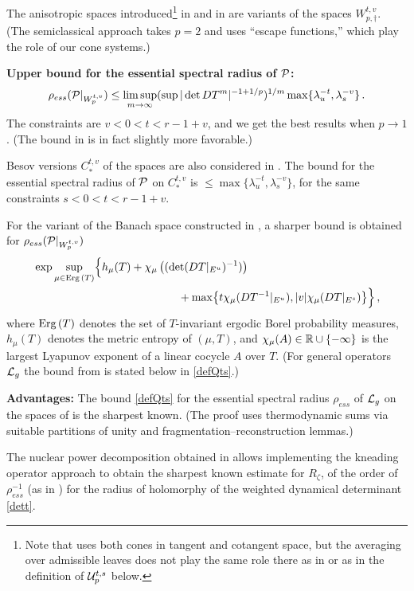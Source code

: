 \documentclass[10pt,twoside]{amsart}
\begin{document}
The anisotropic spaces introduced\footnote{\label{beware}Note that \cite{BT2} uses both cones in tangent and cotangent space, but the averaging
over admissible leaves does not play the same role there as in \cite{GL1, DL} or
as in the definition of $\mathcal{U}^{t,s}_p$ below.} in   \cite{BT2} and in  \cite{FRS} are variants
of the spaces $W^{t,v}_{p,\dagger}$. 
(The semiclassical approach \cite{FRS} takes $p=2$ and uses ``escape functions,'' which play
the role of our cone systems.) 

\medskip

{\bf Upper bound for the essential spectral radius of $\mathcal {P}$:}
$$\rho_{ess}(\mathcal {P}|_{W^{t,v}_p})\le \limsup_{m \to \infty} (\sup |\det DT^{m}|^{-1+1/p} )^{1/m}
\max \{ \lambda_u^{-t}, \lambda_s^{-v}\} \, .$$ 
The constraints are $v<0<t<r-1+v$, and we get the best results when $p\to 1$.
(The bound in \cite{BT1}
is in fact slightly more favorable.)


Besov versions  $C_*^{t,v}$ of the spaces are also considered in \cite{BT1}. The bound
for
the essential spectral radius of $\mathcal {P}$ on  $C_*^{t,v}$
is  $\le \max \{ \lambda_u^{-t}, \lambda_s^{-v}\}$,
for the same constraints  $s<0<t<r-1+v$.


For the variant of the Banach space  constructed in \cite{BT2}, a
sharper bound is obtained for $\rho_{ess}(\mathcal {P}|_{W^{t,v}_p})$
\begin{align*}
\nonumber &\exp \sup_{\mu \in \mathrm{Erg}\,(T)}
\Bigl \{h_\mu(T) + \chi_\mu\left ((\det (DT|_{E^u})^{-1}) \right ) \\
&\qquad\qquad \qquad\qquad\qquad\qquad\quad+
\max\bigl \{t \chi_\mu(DT^{-1}|_{E^u}), |v| \chi_\mu(DT|_{E^s} )\bigr \}
\Bigr \}\, ,
\end{align*}
where $\mathrm{Erg}\,(T)$ denotes the set of  $T$-invariant 
ergodic Borel probability
measures,
$h_\mu(T)$ denotes  the metric entropy of $(\mu,T)$,
and $\chi_\mu(A)\in \mathbb{R} \cup \{-\infty\}$ is the largest Lyapunov
exponent of a linear cocycle $A$ over $T$.
(For general operators $\mathcal{L}_g$ the bound from \cite{BT2} is stated below in \eqref{defQts}.)

\smallskip

{\bf Advantages:}
The bound \eqref{defQts} for  the essential
spectral radius $\rho_{ess}$ of $\mathcal{L}_g$ on the spaces of \cite{BT2} is the sharpest known.
(The proof uses  thermodynamic sums via suitable partitions of unity
and fragmentation--reconstruction lemmas.)

The nuclear power decomposition obtained in \cite{BT2,Ba}  allows  
implementing the kneading operator approach to obtain  the sharpest
known estimate for $R_\zeta$, of the order of $\rho_{ess}^{-1}$ (as in  \cite{Ki}) for the radius
of holomorphy of the weighted
dynamical determinant \eqref{dett}. 
\end{document}
